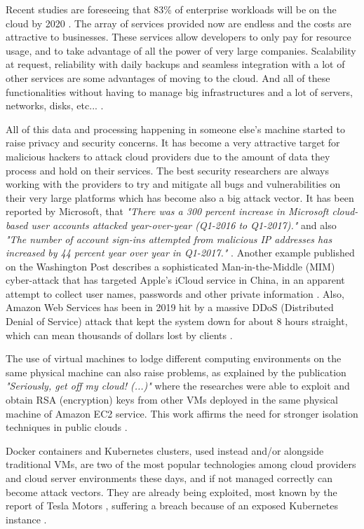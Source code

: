 Recent studies are foreseeing that 83{\%} of enterprise workloads will be on the cloud by 2020 \cite{cloud_statistic:1}. The array of services provided now are endless and the costs are attractive to businesses. These services allow developers to only pay for resource usage, and to take advantage of all the power of very large companies. Scalability at request, reliability with daily backups and seamless integration with a lot of other services are some advantages of moving to the cloud. And all of these functionalities without having to manage big infrastructures and a lot of servers, networks, disks, etc... \cite{cloud_benefits:1}.

All of this data and processing happening in someone else's machine started to raise privacy and security concerns. It has become a very attractive target for malicious hackers to attack cloud providers due to the amount of data they process and hold on their services. The best security researchers are always working with the providers to try and mitigate all bugs and vulnerabilities on their very large platforms which has become also a big attack vector. It has been reported by Microsoft, that \textit{"There was a 300 percent increase in Microsoft cloud-based user accounts attacked year-over-year (Q1-2016 to Q1-2017)."} and also \textit{"The number of account sign-ins attempted from malicious IP addresses has increased by 44 percent year over year in Q1-2017."} \cite{cloud_attacks:1}. Another example published on the Washington Post describes a sophisticated Man-in-the-Middle (\gls{MIM}) cyber-attack that has targeted Apple’s iCloud service in China, in an apparent attempt to collect user names, passwords and other private information \cite{cloud_attacks:2}. Also, Amazon Web Services has been in 2019 hit by a massive \gls{DDoS} (Distributed Denial of Service) attack that kept the system down for about 8 hours straight, which can mean thousands of dollars lost by clients \cite{cloud_attacks:3}.

The use of virtual machines to lodge different computing environments on the same physical machine can also raise problems, as explained by the publication \textit{"Seriously, get off my cloud! (...)"} where the researches were able to exploit and obtain \gls{RSA} (encryption) keys from other \glspl{VM} deployed in the same physical machine of Amazon EC2 service. This work affirms the need for stronger isolation techniques in public clouds \cite{cryptoeprint:2015:898}.

Docker containers and Kubernetes clusters, used instead and/or alongside traditional \glspl{VM}, are two of the most popular technologies among cloud providers and cloud server environments these days, and if not managed correctly can become attack vectors. They are already being exploited, most known by the report of Tesla Motors \cite{tesla_leak:1}, suffering a breach because of an exposed Kubernetes instance \cite{docker_leak:1, kubernetes_leak:1}.

